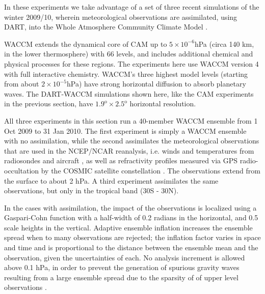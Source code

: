In these experiments we take advantage of a set of three recent simulations of the winter 2009/10, wherein meteorological observations are assimilated, using DART, into the Whole Atmosphere Community Climate Model \citep[WACCM][]{Marsh2013}. 

WACCM extends the dynamical core of CAM up to $5 \times 10^{-6}$hPa (circa 140 km, in the lower thermosphere) with 66 levels, and includes additional chemical and physical processes for these regions. 
The experiments here use WACCM version 4 with full interactive chemistry.
WACCM's three highest model levels (starting from about $2 \times 10^{-5}$hPa) have strong horizontal diffusion to absorb planetary waves. 
The DART-WACCM simulations shown here, like the CAM experiments in the previous section, have $1.9^{\text{o}} \times 2.5^{\text{o}}$ horizontal resolution.


All three experiments in this section 
run a 40-member WACCM ensemble from 1 Oct 2009 to 31 Jan 2010. 
The first experiment is simply a WACCM ensemble with no assimilation, while the second 
assimilates the meteorological observations that are used in the NCEP/NCAR reanalysis, i.e. winds and temperatures from radiosondes and aircraft \citep{Saha2010}, as well as refractivity profiles measured via GPS radio-occultation by the COSMIC satellite constellation \citep{Anthes2008}.
The observations extend from the surface to about 2 hPa. 
A third experiment assimilates the same observations, but only in the tropical band (30S - 30N). 

In the cases with assimilation, the impact of the observations is localized using a  
Gaspari-Cohn function \citep{Gaspari1999} with a half-width of 0.2 radians in the horizontal, and 0.5 scale heights in the vertical.  
Adaptive ensemble inflation \citep{Anderson2009tellus} increases the ensemble spread when to many observations are rejected; the inflation factor varies in space and time and is proportional to the distance between the ensemble mean and the observation, given the uncertainties of each.  
No analysis increment is allowed above 0.1 hPa, in order to prevent the generation of spurious gravity waves resulting from a large ensemble spread due to the sparsity of of upper level observations \citep{Polavarapu2005b}. 

